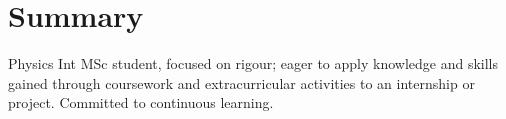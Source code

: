 
\section{Summary}
Physics Int MSc student, focused on rigour; eager to apply knowledge and skills gained through coursework and extracurricular activities to an internship or project. Committed to continuous learning.
